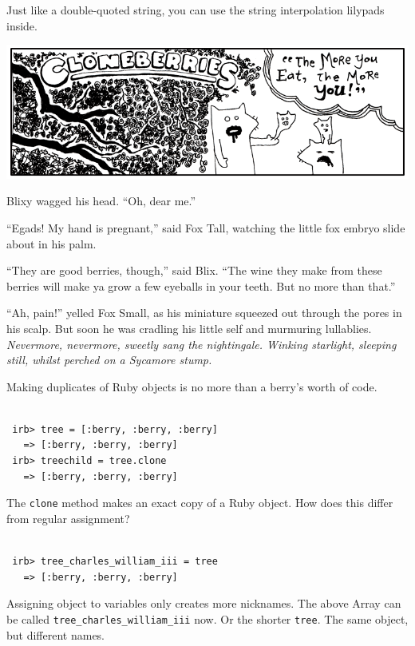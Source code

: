 \documentclass[10pt,twoside]{report}
\begin{document}
Just like a double-quoted string, you can use the string interpolation
lilypads inside.

	\includegraphics[width=1.0\textwidth]{cache/74.png}

Blixy wagged his head.  ``Oh, dear me.''

``Egads! My hand is pregnant,'' said Fox Tall, watching the little fox
embryo slide about in his palm.

``They are good berries, though,'' said Blix.  ``The wine they make
from these berries will make ya grow a few eyeballs in your teeth.
But no more than that.''

``Ah, pain!'' yelled Fox Small, as his miniature squeezed out through
the pores in his scalp.  But soon he was cradling his little self and
murmuring lullablies.  {\em Nevermore, nevermore, sweetly sang the
  nightingale.  Winking starlight, sleeping still, whilst perched on a
  Sycamore stump.}

Making duplicates of Ruby objects is no more than a berry's worth of
code.


\begin{lstlisting}

 irb> tree = [:berry, :berry, :berry]
   => [:berry, :berry, :berry]
 irb> treechild = tree.clone
   => [:berry, :berry, :berry]

\end{lstlisting}


The \lstinline[breaklines=true]|clone| method makes an exact copy of a
Ruby object.  How does this differ from regular assignment?


\begin{lstlisting}

 irb> tree_charles_william_iii = tree
   => [:berry, :berry, :berry]

\end{lstlisting}


Assigning object to variables only creates more nicknames.  The above
Array can be called
\lstinline[breaklines=true]|tree_charles_william_iii| now.  Or the
shorter \lstinline[breaklines=true]|tree|.  The same object, but
different names.
\end{document}
